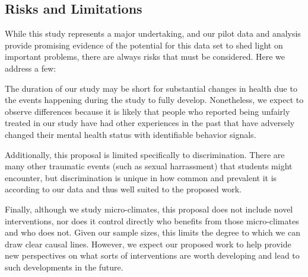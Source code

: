
\subsection{Risks and Limitations}
While this study represents a major undertaking, and our pilot data and analysis provide promising evidence of the potential for this data set to shed light on important problems, there are always risks that must be considered. Here we address a few:

The duration of our study may be short for substantial changes in health 
due to the events happening during the study to fully develop. Nonetheless, we expect to observe differences because it is likely that people who reported being unfairly treated in our study have had other experiences in the past that have adversely changed their mental health status with identifiable behavior signals.   

Additionally, this proposal is limited specifically to discrimination. There are many other traumatic events (such as sexual harrassment) that students might encounter, but discrimination is unique in how common and prevalent it is according to our data and thus well suited to the proposed work.

Finally, although we study micro-climates, this proposal does not include novel interventions, nor does it control directly who benefits from those micro-climates and who does not. Given our sample sizes, this limits the degree to which we can draw clear causal lines. However, we expect our proposed work to help provide new perspectives on what sorts of interventions are worth developing and lead to such developments in the future. 